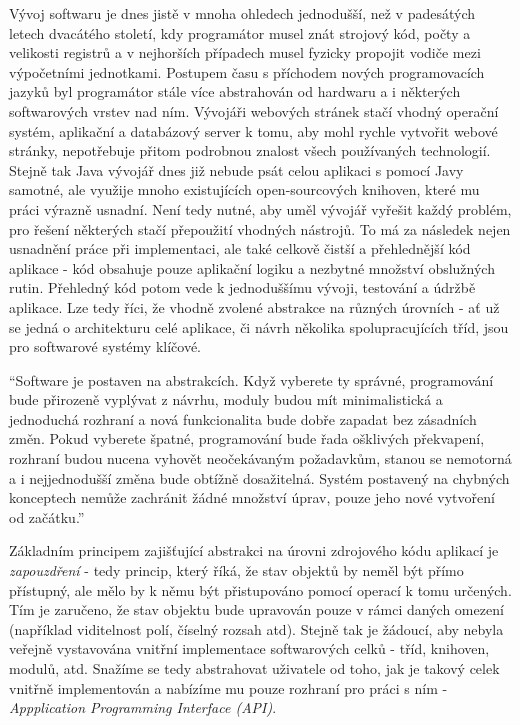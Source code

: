 Vývoj softwaru je dnes jistě v mnoha ohledech jednodušší, než v padesátých letech dvacátého století, kdy programátor musel znát strojový kód, počty a velikosti registrů a v nejhorších případech musel fyzicky propojit vodiče mezi výpočetními jednotkami. Postupem času s příchodem nových programovacích jazyků byl programátor stále více abstrahován od hardwaru a i některých softwarových vrstev nad ním. Vývojáři webových stránek stačí vhodný operační systém, aplikační a databázový server k tomu, aby mohl rychle vytvořit webové stránky, nepotřebuje přitom podrobnou znalost všech používaných technologií. Stejně tak Java vývojář dnes již nebude psát celou aplikaci s pomocí Javy samotné, ale využije mnoho existujících open-sourcových knihoven, které mu práci výrazně usnadní. Není tedy nutné, aby uměl vývojář vyřešit každý problém, pro řešení některých stačí přepoužití vhodných nástrojů. To má za následek nejen usnadnění práce při implementaci, ale také celkově čistší a přehlednější kód aplikace - kód obsahuje pouze aplikační logiku a nezbytné množství obslužných rutin. Přehledný kód potom vede k jednoduššímu vývoji, testování a údržbě aplikace. Lze tedy říci, že vhodně zvolené abstrakce na různých úrovních - ať už se jedná o architekturu celé aplikace, či návrh několika spolupracujících tříd, jsou pro softwarové systémy klíčové.

``Software je postaven na abstrakcích. Když vyberete ty správné, programování bude přirozeně vyplývat z návrhu, moduly budou mít minimalistická a jednoduchá rozhraní a nová funkcionalita bude dobře zapadat bez zásadních změn. Pokud vyberete špatné, programování bude řada ošklivých překvapení, rozhraní budou nucena vyhovět neočekávaným požadavkům, stanou se nemotorná a i nejjednodušší změna bude obtížně dosažitelná. Systém postavený na chybných konceptech nemůže zachránit žádné množství úprav, pouze jeho nové vytvoření od začátku.'' \cite{Jackson06}

Základním principem zajišťující abstrakci na úrovni zdrojového kódu aplikací je \textit{zapouzdření} - tedy princip, který říká, že stav objektů by neměl být přímo přístupný, ale mělo by k němu být přistupováno pomocí operací k tomu určených. Tím je zaručeno, že stav objektu bude upravován pouze v rámci daných omezení (například viditelnost polí, číselný rozsah atd). Stejně tak je žádoucí, aby nebyla veřejně vystavována vnitřní implementace softwarových celků - tříd, knihoven, modulů, atd. Snažíme se tedy abstrahovat uživatele od toho, jak je takový celek vnitřně implementován a nabízíme mu pouze rozhraní pro práci s ním - \textit{Appplication Programming Interface (API)}.

